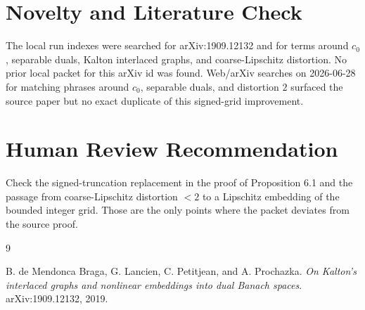 \documentclass[11pt]{article}
\begin{document}
\section*{Novelty and Literature Check}

The local run indexes were searched for arXiv:1909.12132 and for terms around
\(c_0\), separable duals, Kalton interlaced graphs, and coarse-Lipschitz
distortion.  No prior local packet for this arXiv id was found.  Web/arXiv
searches on 2026-06-28 for matching phrases around \(c_0\), separable duals,
and distortion \(2\) surfaced the source paper but no exact duplicate of this
signed-grid improvement.

\section*{Human Review Recommendation}

Check the signed-truncation replacement in the proof of Proposition 6.1 and
the passage from coarse-Lipschitz distortion \(<2\) to a Lipschitz embedding
of the bounded integer grid.  Those are the only points where the packet
deviates from the source proof.

\begin{thebibliography}{9}

B. de Mendonca Braga, G. Lancien, C. Petitjean, and A. Prochazka.
\newblock \emph{On Kalton's interlaced graphs and nonlinear embeddings into
dual Banach spaces}.
\newblock arXiv:1909.12132, 2019.

\end{thebibliography}
\end{document}
